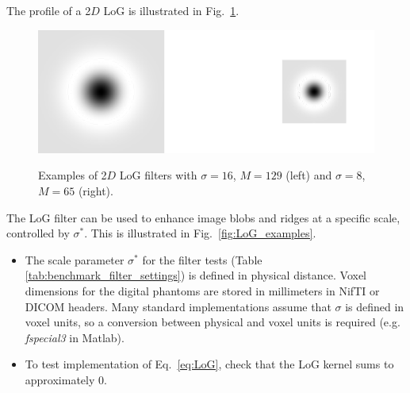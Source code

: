 \documentclass[fleqn,a4paper,oneside,openany]{book}
\begin{document}
The profile of a 2$D$ LoG is illustrated in Fig.~\ref{fig:LoG}.
%
\begin{figure}
\centering
\includegraphics[trim = 0 0 0 0, clip, scale=0.8]{LoG.png}\\
\caption{Examples of 2$D$ LoG filters with $\sigma=16$, $M=129$ (left) and $\sigma=8$, $M=65$ (right).}
  \label{fig:LoG}
\end{figure}
%
The LoG filter can be used to enhance image blobs and ridges at a specific scale, controlled by $\sigma^*$.
This is illustrated in Fig.~\ref{fig:LoG_examples}.

\vspace{2mm}
\begin{tcolorbox}[width=150mm, halign=left, colframe=black, colback=white, boxsep=0mm, arc=3mm, colframe=black!50!white,
title=Implementation Troubleshooting, title filled=true, fonttitle=\bfseries]
\begin{itemize}
\item The scale parameter $\sigma^*$ for the filter tests (Table \ref{tab:benchmark_filter_settings}) is defined in physical distance. Voxel dimensions for the digital phantoms are stored in millimeters in NifTI or DICOM headers. Many standard implementations assume that $\sigma$ is defined in voxel units, so a conversion between physical and voxel units is required (e.g. \textit{fspecial3} in Matlab).
\item To test implementation of Eq.\ \ref{eq:LoG}, check that the LoG kernel sums to approximately 0.
\end{itemize}
\end{tcolorbox}
\end{document}
